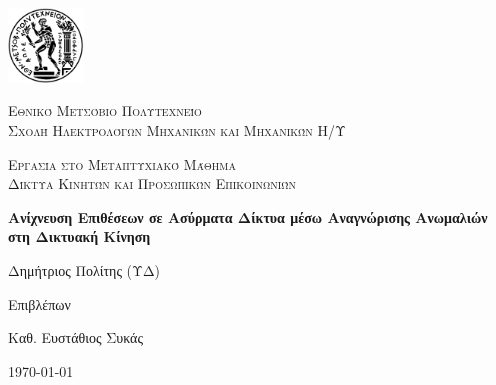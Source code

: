\documentclass[12pt]{report}
\newcommand\blankpage{%
    \null
    \thispagestyle{empty}%
    \addtocounter{page}{-1}%
    \newpage}
\begin{document}

\hypersetup{pageanchor=false}

\begin{titlepage}
  \centering
  \includegraphics[width=0.15\textwidth]{pyrforos}\par\vspace{1cm}
  {\scshape\LARGE Εθνικό Μετσόβιο Πολυτεχνείο\\
  Σχολή Ηλεκτρολόγων Μηχανικών και Μηχανικών Η/Υ\par}
  \vspace{1cm}
  {\scshape\Large Εργασία στο Μεταπτυχιακό Μάθημα\\
  Δίκτυα Κινητών και Προσωπικών Επικοινωνιών\par}
  \vspace{1.5cm}
  {\Large\bfseries Ανίχνευση Επιθέσεων σε Ασύρματα Δίκτυα μέσω Αναγνώρισης Ανωμαλιών στη Δικτυακή Κίνηση\par}
  \vspace{2cm}
  {\large Δημήτριος Πολίτης (ΥΔ)\par}
  \vfill
  Επιβλέπων \par
  Καθ. Ευστάθιος Συκάς

  \vfill

  {\large \today\par}
  \afterpage{\blankpage}
\end{titlepage}

\tableofcontents
\thispagestyle{empty}

\listoftables
\thispagestyle{empty}

\listoffigures
\thispagestyle{empty}

\begin{abstract}
Η ανίχνευση ανωμαλιών στη δικτυακή κίνηση ασύρματων δικτύων είναι μια σημαντική διαδικασία, η οποία χρησιμοποιείται για την διάγνωση βλαβών, την ανίχνευση επιθέσεων και την παρακολούθηση εφαρμογών. Σε αυτό το πόνημα εξετάζουμε διάφορες προσεγγίσεις ανίχνευσης εισβολών, που βασίζονται σε μεθόδους καταγραφής των ανωμαλιών στη δικτυακή κίνηση και οι οποίες περιλαμβάνουν μεταξύ άλλων στατιστικές, \textlatin{signature based} ή μεθόδους που περιλαμβάνουν μηχανική μάθηση (\textlatin{machine learning}). Η προσέγγισή μας βασίζεται στην καταγραφή και ταξινόμηση σύγχρονων μεθόδων ανίχνευσης εισβολών σε ασύρματα δίκτυα(\textlatin{wireless intrusion detection system (IDS)} με βάση τον τύπο του ασύρματου δικτύου, την τεχνική ανίχνευσης, τη διαδικασία συλλογής δεδομένων και τις μεθόδους ανάλυσης. Περιγράφουμε σε αδρές γραμμές τα υπέρ και τα κατά κάθε τεχνικής ανίχνευσης επιθέσεων, λαμβάνοντας υπόψη και την υπολογιστική τους πολυπλοκότητα.
\end{abstract}
\end{document}
